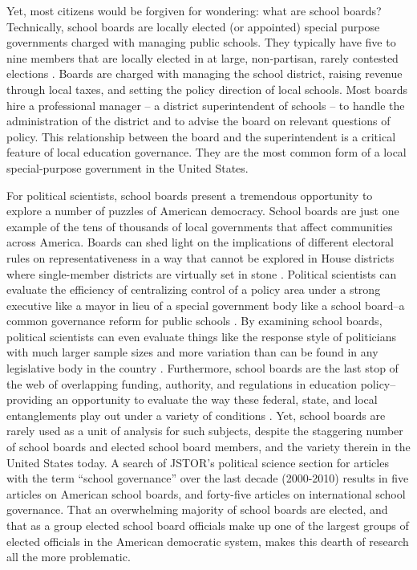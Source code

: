 Yet, most citizens would be forgiven for wondering: what are school boards? Technically, 
school boards are locally elected (or appointed) special purpose governments 
charged with managing public schools. They typically have five to nine members that 
are locally elected in at large, non-partisan, rarely contested elections 
\citep{RefWorks:321}. Boards are charged with managing the school district, raising 
revenue through local taxes, and setting the policy direction of local schools. Most 
boards hire a professional manager -- a district superintendent of schools -- to 
handle the administration of the district and to advise the board on relevant 
questions of policy. This relationship between the board and the superintendent is 
a critical feature of local education governance. They are the most common form 
of a local special-purpose government in the United States. 

For political scientists, school boards present a tremendous opportunity to 
explore a number of puzzles of American democracy. School boards are just one 
example of the tens of thousands of local governments that affect communities 
across America. Boards can shed light on the implications of different electoral 
rules on representativeness in a way that cannot be explored in House districts 
where single-member districts are virtually set in stone \citep{RefWorks:199,
RefWorks:216,RefWorks:238}. Political scientists can evaluate the efficiency of 
centralizing control of a policy area under a strong executive like a mayor in lieu 
of a special government body like a school board--a common governance reform for 
public schools \citep{RefWorks:323, RefWorks:211}. By examining school boards, 
political scientists can even evaluate things like the response style of politicians 
with much larger sample sizes and more variation than can be found in any legislative 
body in the country \citep{RefWorks:313}. Furthermore, school boards are the last 
stop of the web of overlapping funding, authority, and regulations in education 
policy--providing an opportunity to evaluate the way these federal, state, and 
local entanglements play out under a variety of conditions \citep{RefWorks:318}. 
Yet, school boards are rarely used as a unit of analysis for such subjects, despite 
the staggering number of school boards and elected school board members, and the 
variety therein in the United States today. A search of JSTOR's political science 
section for articles with the term ``school governance'' over the last decade 
(2000-2010) results in five articles on American school boards, and forty-five 
articles on international school governance. That an overwhelming majority of 
school boards are elected, and that as a group elected school board officials make 
up one of the largest groups of elected officials in the American democratic system, 
makes this dearth of research all the more problematic. 

